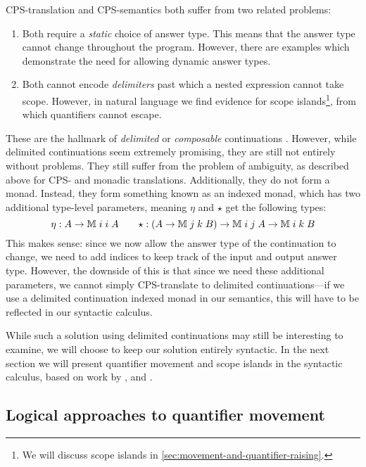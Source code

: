 \vspace*{1\baselineskip}

 CPS-translation and 
CPS-semantics both suffer from two related problems:
\begin{enumerate}
\item Both require a \emph{static} choice of answer type. This
  means that the answer type cannot change throughout the
  program. However, there are examples which demonstrate the need for
  allowing dynamic answer types.
\item Both cannot encode \emph{delimiters} past which a nested
  expression cannot take scope. However, in natural language we find
  evidence for scope islands\footnote{%
    We will discuss scope islands in \autoref{sec:movement-and-quantifier-raising}.
  }, from which quantifiers cannot escape.
\end{enumerate}
These are the hallmark of \emph{delimited} or \emph{composable}
continuations \citep{danvy1990}. However, while delimited
continuations seem extremely promising, they are still not entirely
without problems. They still suffer from the problem of ambiguity, as
described above for CPS- and monadic translations. Additionally, they
do not form a monad. Instead, they form something known as an indexed
monad, which has two additional type-level parameters, meaning $\eta$
and $\star$ get the following types:
\[
  \eta : A\rightarrow\mathbb{M}\;i\;i\;A
  \qquad
  \star: (A\rightarrow\mathbb{M}\;j\;k\;B)\rightarrow\mathbb{M}\;i\;j\;A\rightarrow\mathbb{M}\;i\;k\;B
\]
This makes sense: since we now allow the answer type of the
continuation to change, we need to add indices to keep track of the
input and output answer type. However, the downside of this is that
since we need these additional parameters, we cannot simply
CPS-translate to delimited continuations---if we use a delimited
continuation indexed monad in our semantics, this will have to be
reflected in our syntactic calculus.

While such a solution using delimited continuations may still be
interesting to examine, we will choose to keep our solution entirely
syntactic. In the next section we will present quantifier movement and
scope islands in the syntactic calculus, based on work by
\citet{moortgat1996}, \citet{barker2007} and \citet{barker2015}.




\subsection{Logical approaches to quantifier movement}















